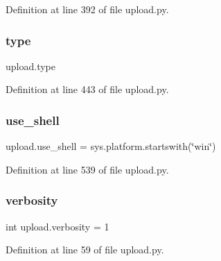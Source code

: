 Definition at line 392 of file upload.\+py.

\mbox{\label{namespaceupload_a4fc56f0dd6613be15c3c4dc3af3619ce}} 
\subsubsection{\texorpdfstring{type}{type}}
{\footnotesize\ttfamily upload.\+type}



Definition at line 443 of file upload.\+py.

\mbox{\label{namespaceupload_afa85ceef00a65cd276a856404eb5f310}} 
\subsubsection{\texorpdfstring{use\+\_\+shell}{use\_shell}}
{\footnotesize\ttfamily upload.\+use\+\_\+shell = sys.\+platform.\+startswith(\char`\"{}win\char`\"{})}



Definition at line 539 of file upload.\+py.

\mbox{\label{namespaceupload_a79aff46409a98c4e5f608c8df1fd4612}} 
\subsubsection{\texorpdfstring{verbosity}{verbosity}}
{\footnotesize\ttfamily int upload.\+verbosity = 1}



Definition at line 59 of file upload.\+py.

